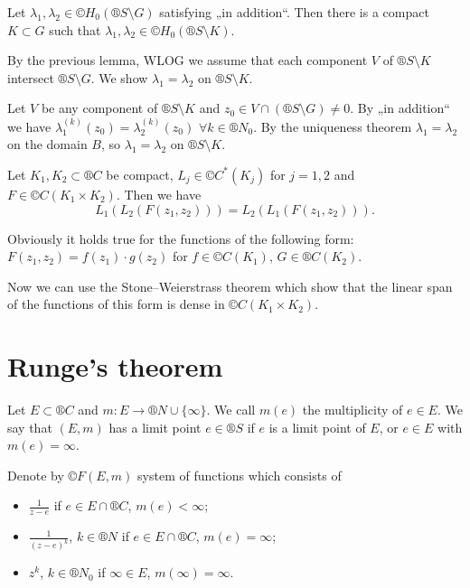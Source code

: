 \documentclass[12pt]{article}					%
\begin{document}
\begin{dukaz}[Step 5]
	Let $λ_1, λ_2 \in ©H_0(®S \setminus G)$ satisfying „in addition“. Then there is a compact $K \subset G$ such that $λ_1, λ_2 \in ©H_0(®S \setminus K)$.

	By the previous lemma, WLOG we assume that each component $V$ of $®S \setminus K$ intersect $®S \setminus G$. We show $λ_1 = λ_2$ on $®S \setminus K$.

	Let $V$ be any component of $®S \setminus K$ and $z_0 \in V \cap (®S \setminus G) ≠ 0$. By „in addition“ we have $λ_1^{(k)}(z_0) = λ_2^{(k)}(z_0)$ $\forall k \in ®N_0$. By the uniqueness theorem $λ_1 = λ_2$ on the domain $B$, so $λ_1 = λ_2$ on $®S \setminus K$.
\end{dukaz}

\begin{lemma}[Fubini]
	Let $K_1, K_2 \subset ®C$ be compact, $L_j \in ©C^*(K_j)$ for $j = 1, 2$ and $F \in ©C(K_1 \times K_2)$. Then we have
	$$ L_1(L_2(F(z_1, z_2))) = L_2(L_1(F(z_1, z_2))). $$

	\begin{dukazin}[Sketch]
		Obviously it holds true for the functions of the following form: $F(z_1, z_2) = f(z_1)·g(z_2)$ for $f \in ©C(K_1)$, $G \in ®C(K_2)$.

		Now we can use the Stone–Weierstrass theorem which show that the linear span of the functions of this form is dense in $©C(K_1 \times K_2)$.
	\end{dukazin}
\end{lemma}

\section{Runge's theorem}
\begin{definice}[Notation]
	Let $E \subset ®C$ and $m: E \rightarrow ®N \cup \{∞\}$. We call $m(e)$ the multiplicity of $e \in E$. We say that $(E, m)$ has a limit point $e \in ®S$ if $e$ is a limit point of $E$, or $e \in E$ with $m(e) = ∞$.

	Denote by $©F(E, m)$ system of functions which consists of
	\begin{itemize}
		\item $\frac{1}{z - e}$ if $e \in E \cap ®C$, $m(e) < ∞$;
		\item $\frac{1}{(z - e)^k}$, $k \in ®N$ if $e \in E \cap ®C$, $m(e) = ∞$;
		\item $z^k$, $k \in ®N_0$ if $∞ \in E$, $m(∞) = ∞$.
	\end{itemize}
\end{definice}
\end{document}
